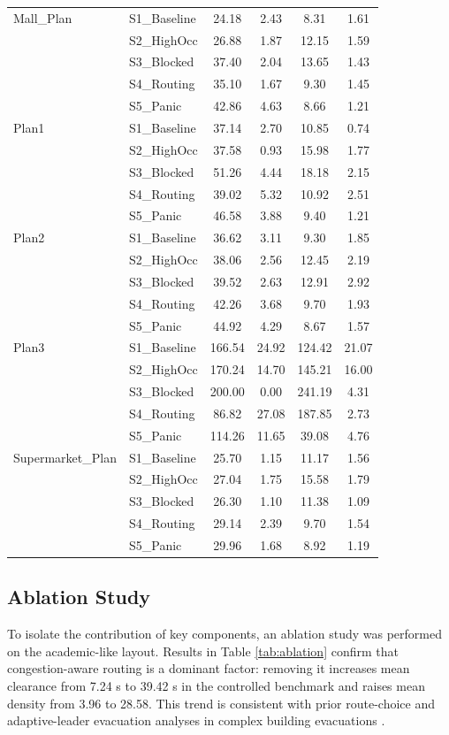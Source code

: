 \documentclass[journal]{IEEEtran}
\begin{document}
\begin{table}[t]
\begin{tabular}{llcccc}
\midrule
Mall\_Plan & S1\_Baseline & 24.18 & 2.43 & 8.31 & 1.61 \\
 & S2\_HighOcc & 26.88 & 1.87 & 12.15 & 1.59 \\
 & S3\_Blocked & 37.40 & 2.04 & 13.65 & 1.43 \\
 & S4\_Routing & 35.10 & 1.67 & 9.30 & 1.45 \\
 & S5\_Panic & 42.86 & 4.63 & 8.66 & 1.21 \\
\midrule
Plan1 & S1\_Baseline & 37.14 & 2.70 & 10.85 & 0.74 \\
 & S2\_HighOcc & 37.58 & 0.93 & 15.98 & 1.77 \\
 & S3\_Blocked & 51.26 & 4.44 & 18.18 & 2.15 \\
 & S4\_Routing & 39.02 & 5.32 & 10.92 & 2.51 \\
 & S5\_Panic & 46.58 & 3.88 & 9.40 & 1.21 \\
\midrule
Plan2 & S1\_Baseline & 36.62 & 3.11 & 9.30 & 1.85 \\
 & S2\_HighOcc & 38.06 & 2.56 & 12.45 & 2.19 \\
 & S3\_Blocked & 39.52 & 2.63 & 12.91 & 2.92 \\
 & S4\_Routing & 42.26 & 3.68 & 9.70 & 1.93 \\
 & S5\_Panic & 44.92 & 4.29 & 8.67 & 1.57 \\
\midrule
Plan3 & S1\_Baseline & 166.54 & 24.92 & 124.42 & 21.07 \\
 & S2\_HighOcc & 170.24 & 14.70 & 145.21 & 16.00 \\
 & S3\_Blocked & 200.00 & 0.00 & 241.19 & 4.31 \\
 & S4\_Routing & 86.82 & 27.08 & 187.85 & 2.73 \\
 & S5\_Panic & 114.26 & 11.65 & 39.08 & 4.76 \\
\midrule
Supermarket\_Plan & S1\_Baseline & 25.70 & 1.15 & 11.17 & 1.56 \\
 & S2\_HighOcc & 27.04 & 1.75 & 15.58 & 1.79 \\
 & S3\_Blocked & 26.30 & 1.10 & 11.38 & 1.09 \\
 & S4\_Routing & 29.14 & 2.39 & 9.70 & 1.54 \\
 & S5\_Panic & 29.96 & 1.68 & 8.92 & 1.19 \\
\bottomrule
\end{tabular}
\end{table}

\subsection{Ablation Study}
To isolate the contribution of key components, an ablation study was performed on the academic-like layout. Results in Table \ref{tab:ablation} confirm that congestion-aware routing is a dominant factor: removing it increases mean clearance from 7.24 s to 39.42 s in the controlled benchmark and raises mean density from 3.96 to 28.58. This trend is consistent with prior route-choice and adaptive-leader evacuation analyses in complex building evacuations \cite{wang2022bounded,lopez2022adaptive}.
\end{document}
